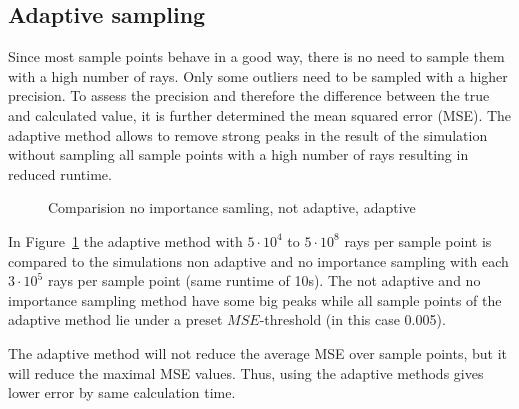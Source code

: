 \subsection{Adaptive sampling}
\label{subsec:adaptive_sampling}
Since most sample points behave in a good way, there is no need
to sample them with a high number of rays. Only some outliers need to
be sampled with a higher precision. To assess the precision
and therefore the difference between the true and calculated value,
it is further determined the mean squared error (MSE).
The adaptive method allows to remove strong peaks in the result
of the simulation without sampling all sample points with
a high number of rays resulting in reduced runtime.
\begin{figure}[H]
  \centerline{
    }
  \caption{Comparision no importance samling, not adaptive, adaptive}
  \label{plot:adaptive}
\end{figure}

In Figure~\ref{plot:adaptive} the adaptive method with 
$5 \cdot 10^4$ to $5 \cdot 10^8$ rays per sample point is compared to the simulations
non adaptive and no importance sampling with each $3 \cdot 10^5$ rays per sample point (same runtime of 10s).
The not adaptive and no importance sampling method have some big peaks while all sample points of 
the adaptive method lie under a preset $MSE$-threshold (in this case 0.005). 

The adaptive method will not reduce the average MSE over sample points,
but it will reduce the maximal MSE values. Thus, using the adaptive
methods gives lower error by same calculation time.


